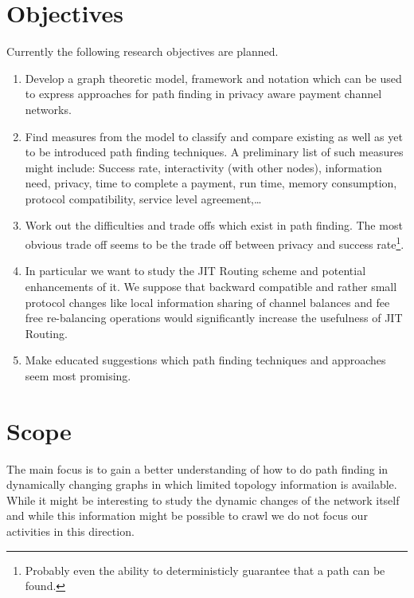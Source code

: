 \documentclass[a4paper]{paper}
\begin{document}
\section{Objectives}
Currently the following research objectives are planned.
\begin{enumerate}
\item Develop a graph theoretic model, framework and notation which can be used to express approaches for path finding in privacy aware payment channel networks.
\item Find measures from the model to classify and compare existing as well as yet to be introduced path finding techniques. A preliminary list of such measures might include: Success rate, interactivity (with other nodes), information need, privacy, time to complete a payment, run time, memory consumption, protocol compatibility, service level agreement,\dots
\item Work out the difficulties and trade offs which exist in path finding. The most obvious trade off seems to be the trade off between privacy and success rate\footnote{Probably even the ability to deterministicly guarantee that a path can be found.}.
\item In particular we want to study the JIT Routing scheme and potential enhancements of it. We suppose that backward compatible and rather small protocol changes like local information sharing of channel balances and fee free re-balancing operations would significantly increase the usefulness of JIT Routing.
\item Make educated suggestions which path finding techniques and approaches seem most promising.
\end{enumerate}

\section{Scope}
The main focus is to gain a better understanding of how to do path finding in dynamically changing graphs in which limited topology information is available.
While it might be interesting to study the dynamic changes of the network itself and while this information might be possible to crawl we do not focus our activities in this direction.
\end{document}
